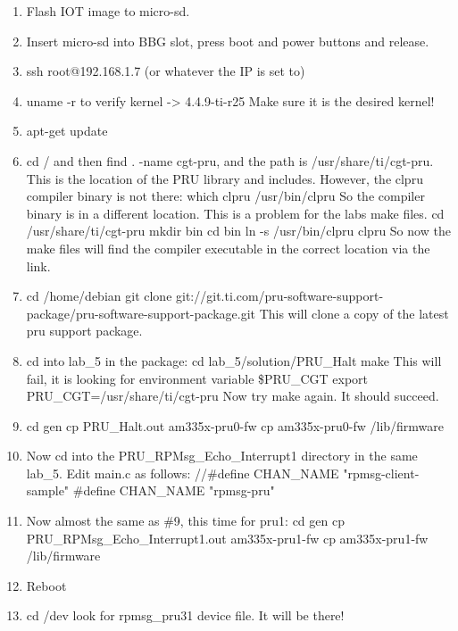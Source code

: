 \begin{enumerate}
\item Flash IOT image to micro-sd.
\item  Insert micro-sd into BBG slot, press boot and power buttons and release.
\item  ssh root@192.168.1.7 (or whatever the IP is set to)
\item  uname -r to verify kernel -> 4.4.9-ti-r25  Make sure it is the desired kernel!
\item  apt-get update
\item  cd / and then find . -name cgt-pru, and the path is /usr/share/ti/cgt-pru.  This is the location of the PRU library and includes.
However, the clpru compiler binary is not there:
which clpru
/usr/bin/clpru
So the compiler binary is in a different location.  This is a problem for the labs make files.
cd /usr/share/ti/cgt-pru
mkdir bin
cd bin
ln -s /usr/bin/clpru clpru
So now the make files will find the compiler executable in the correct location via the link.
\item  cd /home/debian
git clone git://git.ti.com/pru-software-support-package/pru-software-support-package.git
This will clone a copy of the latest pru support package.
\item  cd into lab\_5 in the package:
cd lab\_5/solution/PRU\_Halt
make
This will fail, it is looking for environment variable \$PRU\_CGT
export PRU\_CGT=/usr/share/ti/cgt-pru
Now try make again.  It should succeed.
\item  cd gen
cp PRU\_Halt.out am335x-pru0-fw
cp am335x-pru0-fw /lib/firmware
\item  Now cd into the PRU\_RPMsg\_Echo\_Interrupt1 directory in the same lab\_5.
Edit main.c as follows:
//\#define CHAN\_NAME					"rpmsg-client-sample"
\#define CHAN\_NAME					"rpmsg-pru"
\item  Now almost the same as \#9, this time for pru1:
cd gen
cp PRU\_RPMsg\_Echo\_Interrupt1.out am335x-pru1-fw
cp am335x-pru1-fw /lib/firmware
\item  Reboot
\item  cd /dev look for rpmsg\_pru31 device file.  It will be there!
\end{enumerate}


